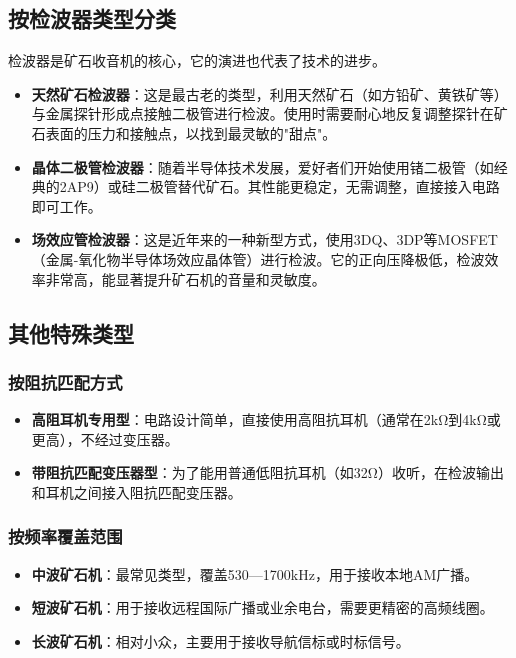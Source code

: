 \documentclass[12pt,UTF8]{ctexbook}
\begin{document}
\subsection{按检波器类型分类}

检波器是矿石收音机的核心，它的演进也代表了技术的进步。

\begin{itemize}[leftmargin=3.5em]
	\item \textbf{天然矿石检波器}：这是最古老的类型，利用天然矿石（如方铅矿、黄铁矿等）与金属探针形成点接触二极管进行检波。使用时需要耐心地反复调整探针在矿石表面的压力和接触点，以找到最灵敏的"甜点"。
	\item \textbf{晶体二极管检波器}：随着半导体技术发展，爱好者们开始使用锗二极管（如经典的2AP9）或硅二极管替代矿石。其性能更稳定，无需调整，直接接入电路即可工作。
	\item \textbf{场效应管检波器}：这是近年来的一种新型方式，使用3DQ、3DP等MOSFET（金属-氧化物半导体场效应晶体管）进行检波。它的正向压降极低，检波效率非常高，能显著提升矿石机的音量和灵敏度。
\end{itemize}

\subsection{其他特殊类型}

\subsubsection{按阻抗匹配方式}
\begin{itemize}[leftmargin=3.5em]
	\item \textbf{高阻耳机专用型}：电路设计简单，直接使用高阻抗耳机（通常在2kΩ到4kΩ或更高），不经过变压器。
	\item \textbf{带阻抗匹配变压器型}：为了能用普通低阻抗耳机（如32Ω）收听，在检波输出和耳机之间接入阻抗匹配变压器。
\end{itemize}

\subsubsection{按频率覆盖范围}
\begin{itemize}[leftmargin=3.5em]
	\item \textbf{中波矿石机}：最常见类型，覆盖530—1700kHz，用于接收本地AM广播。
	\item \textbf{短波矿石机}：用于接收远程国际广播或业余电台，需要更精密的高频线圈。
	\item \textbf{长波矿石机}：相对小众，主要用于接收导航信标或时标信号。
\end{itemize}
\end{document}
